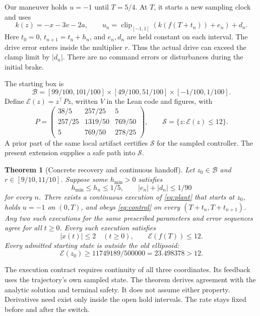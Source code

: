 \documentclass[10pt]{article}
\newtheorem{theorem}{Theorem}
\newcommand{\E}{\mathcal E}
\newcommand{\clip}{\operatorname{clip}}
\begin{document}
Our maneuver holds $u=-1$ until $T=5/4$. At $T$, it starts a new sampling clock and uses
\begin{equation}\label{eq:control}
k(z)=-x-3v-2a,\qquad
u_n=\clip_{[-1,1]}(k(f(T+t_n))+e_n)+d_n.
\end{equation}
Here $t_0=0$, $t_{n+1}=t_n+h_n$, and $e_n,d_n$ are held constant on each interval. The drive error enters inside the multiplier $r$. Thus the actual drive can exceed the clamp limit by $|d_n|$. There are no command errors or disturbances during the initial brake.

The starting box is
\begin{equation}\label{eq:box}
\mathcal B=
[99/100,101/100]\times[49/100,51/100]\times[-1/100,1/100].
\end{equation}
Define $\E(z)=z^\top Pz$, written $V$ in the Lean code and figures, with
\begin{equation}\label{eq:P}
P=\begin{pmatrix}
38/5&257/25&5\\
257/25&1319/50&769/50\\
5&769/50&278/25
\end{pmatrix},\qquad
\mathcal S=\{z:\E(z)\le12\}.
\end{equation}
A prior part of the same local artifact certifies $\mathcal S$ for the sampled controller. The present extension supplies a safe path into $\mathcal S$.

\begin{theorem}[Concrete recovery and continuous handoff]\label{thm:main}
Let $z_0\in\mathcal B$ and $r\in[9/10,11/10]$. Suppose some $h_{\min}>0$ satisfies
\[
h_{\min}\le h_n\le1/5,\qquad |e_n|+|d_n|\le1/90
\]
for every $n$. There exists a continuous execution of \eqref{eq:plant} that starts at $z_0$, holds $u=-1$ on $(0,T)$, and obeys \eqref{eq:control} on every $(T+t_n,T+t_{n+1})$. Any two such executions for the same prescribed parameters and error sequences agree for all $t\ge0$. Every such execution satisfies
\[
|x(t)|\le2\quad(t\ge0),\qquad \E(f(T))\le12.
\]
Every admitted starting state is outside the old ellipsoid:
\[
\E(z_0)\ge11749189/500000=23.498378>12.
\]
\end{theorem}

The execution contract requires continuity of all three coordinates. Its feedback uses the trajectory's own sampled state. The theorem derives agreement with the analytic solution and terminal safety. It does not assume either property. Derivatives need exist only inside the open hold intervals. The rate stays fixed before and after the switch.
\end{document}
